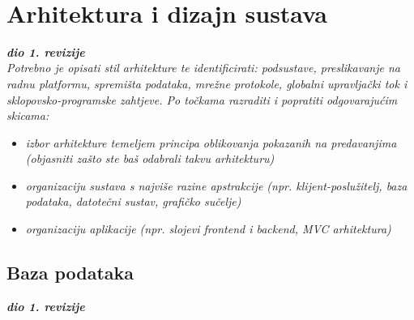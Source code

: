 $  $\chapter{Arhitektura i dizajn sustava}
		
		\textbf{\textit{dio 1. revizije}}\\

		\textit{ Potrebno je opisati stil arhitekture te identificirati: podsustave, preslikavanje na radnu platformu, spremišta podataka, mrežne protokole, globalni upravljački tok i sklopovsko-programske zahtjeve. Po točkama razraditi i popratiti odgovarajućim skicama:}
	\begin{itemize}
		\item 	\textit{izbor arhitekture temeljem principa oblikovanja pokazanih na predavanjima (objasniti zašto ste baš odabrali takvu arhitekturu)}
		\item 	\textit{organizaciju sustava s najviše razine apstrakcije (npr. klijent-poslužitelj, baza podataka, datotečni sustav, grafičko sučelje)}
		\item 	\textit{organizaciju aplikacije (npr. slojevi frontend i backend, MVC arhitektura) }		
	\end{itemize}

	
		

		

				
		\section{Baza podataka}
			
			\textbf{\textit{dio 1. revizije}}\\
			
